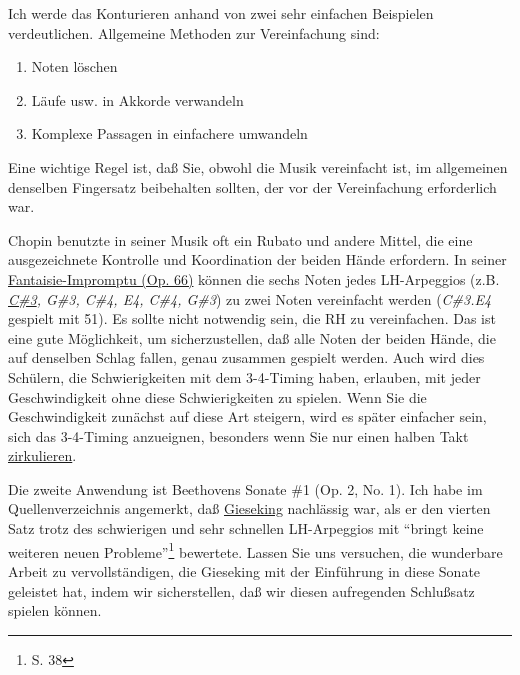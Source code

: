 Ich werde das Konturieren anhand von zwei sehr einfachen Beispielen verdeutlichen.
Allgemeine Methoden zur Vereinfachung sind:

\begin{enumerate}[label={\arabic*.}] 
\item Noten löschen
\item Läufe usw. in Akkorde verwandeln
\item Komplexe Passagen in einfachere umwandeln
\end{enumerate}

Eine wichtige Regel ist, daß Sie, obwohl die Musik vereinfacht ist, im allgemeinen denselben Fingersatz beibehalten sollten, der vor der Vereinfachung erforderlich war.

Chopin benutzte in seiner Musik oft ein Rubato und andere Mittel, die eine ausgezeichnete Kontrolle und Koordination der beiden Hände erfordern.
In seiner \hyperref[c1iii2fi]{Fantaisie-Impromptu (Op. 66)} können die sechs Noten jedes LH-Arpeggios (z.B. \textit{\hyperref[Noten]{C\#3}, G\#3, C\#4, E4, C\#4, G\#3}) zu zwei Noten vereinfacht werden (\textit{C\#3.E4} gespielt mit 51).
Es sollte nicht notwendig sein, die RH zu vereinfachen.
Das ist eine gute Möglichkeit, um sicherzustellen, daß alle Noten der beiden Hände, die auf denselben Schlag fallen, genau zusammen gespielt werden.
Auch wird dies Schülern, die Schwierigkeiten mit dem 3-4-Timing haben, erlauben, mit jeder Geschwindigkeit ohne diese Schwierigkeiten zu spielen.
Wenn Sie die Geschwindigkeit zunächst auf diese Art steigern, wird es später einfacher sein, sich das 3-4-Timing anzueignen, besonders wenn Sie nur einen halben Takt \hyperref[c1iii2]{zirkulieren}.

Die zweite Anwendung ist Beethovens Sonate \#1 (Op. 2, No. 1).
Ich habe im Quellenverzeichnis angemerkt, daß \hyperref[Gieseking]{Gieseking} nachlässig war, als er den vierten Satz trotz des schwierigen und sehr schnellen LH-Arpeggios mit \enquote{bringt keine weiteren neuen Probleme}\footnote{S. 38} bewertete.
Lassen Sie uns versuchen, die wunderbare Arbeit zu vervollständigen, die Gieseking mit der Einführung in diese Sonate geleistet hat, indem wir sicherstellen, daß wir diesen aufregenden Schlußsatz spielen können.

